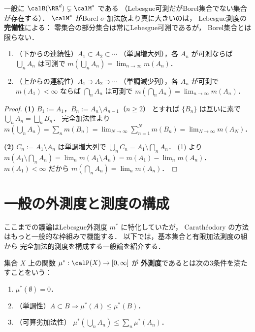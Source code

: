 \begin{remark}
一般に $\calB(\RR^d) \subsetneq \calM^*$ である
（Lebesgue可測だがBorel集合でない集合が存在する）．
$\calM^*$ がBorel $\sigma$-加法族より真に大きいのは，
Lebesgue測度の\textbf{完備性}による：
零集合の部分集合は常にLebesgue可測であるが，
Borel集合とは限らない．
\end{remark}

\begin{theorem}[測度の連続性]\label{thm:measure-continuity}
\begin{enumerate}
\item （下からの連続性）$A_1 \subset A_2 \subset \cdots$
（単調増大列），各 $A_n$ が可測ならば
$\bigcup_n A_n$ は可測で
$m\!\left(\bigcup_n A_n\right) = \lim_{n \to \infty} m(A_n)$．
\item （上からの連続性）$A_1 \supset A_2 \supset \cdots$
（単調減少列），各 $A_n$ が可測で $m(A_1) < \infty$ ならば
$\bigcap_n A_n$ は可測で
$m\!\left(\bigcap_n A_n\right) = \lim_{n \to \infty} m(A_n)$．
\end{enumerate}
\end{theorem}
\begin{proof}
\textbf{(1)}\quad
$B_1 := A_1$，$B_n := A_n \setminus A_{n-1}$（$n \ge 2$）
とすれば $\{B_n\}$ は互いに素で
$\bigcup_n A_n = \bigsqcup_n B_n$．
完全加法性より
$m(\bigcup_n A_n) = \sum_n m(B_n)
= \lim_{N \to \infty} \sum_{n=1}^N m(B_n)
= \lim_{N \to \infty} m(A_N)$．

\textbf{(2)}\quad
$C_n := A_1 \setminus A_n$ は単調増大列で
$\bigcup_n C_n = A_1 \setminus \bigcap_n A_n$．
(1) より
$m(A_1 \setminus \bigcap_n A_n) = \lim_n m(A_1 \setminus A_n)
= m(A_1) - \lim_n m(A_n)$．
$m(A_1) < \infty$ だから
$m(\bigcap_n A_n) = \lim_n m(A_n)$．
\end{proof}

\section{一般の外測度と測度の構成}\label{sec:general-outer-measure}

ここまでの議論はLebesgue外測度 $m^*$ に特化していたが，
Carath\'eodory の方法はもっと一般的な枠組みで機能する．
以下では，基本集合と有限加法測度の組から
完全加法的測度を構成する一般論を紹介する．

\begin{definition}[外測度（一般）]\label{def:general-outer-measure}
集合 $X$ 上の関数 $\mu^* : \calP(X) \to [0,\infty]$ が
\textbf{外測度}であるとは次の3条件を満たすことをいう：
\begin{enumerate}
\item $\mu^*(\emptyset) = 0$．
\item （単調性）$A \subset B \Rightarrow \mu^*(A) \le \mu^*(B)$．
\item （可算劣加法性）
$\mu^*(\bigcup_n A_n) \le \sum_n \mu^*(A_n)$．
\end{enumerate}
\end{definition}


